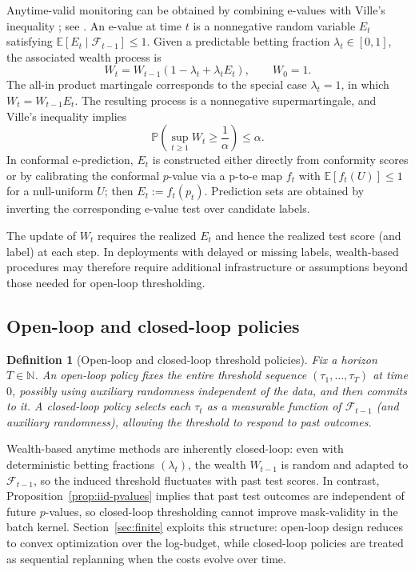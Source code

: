 \documentclass{uai2026} %
\newtheorem{definition}[theorem]{Definition}
\newcommand{\N}{\mathbb{N}}
\newcommand{\1}{\mathbf{1}}
\newcommand{\prob}{\mathbb{P}}
\newcommand{\expec}{\mathbb{E}}
\newcommand{\F}{\mathcal{F}}
\begin{document}
Anytime-valid monitoring can be obtained by combining e-values with Ville's inequality \citep{ville1939etude}; see \citet{gauthier2025values}.
An e-value at time $t$ is a nonnegative random variable $E_t$ satisfying $\expec[E_t\mid\F_{t-1}]\le 1$.
Given a predictable betting fraction $\lambda_t\in[0,1]$, the associated wealth process is
\begin{equation*}
  W_t = W_{t-1}(1-\lambda_t+\lambda_t E_t),\qquad W_0=1.
\end{equation*}
The all-in product martingale corresponds to the special case $\lambda_t=1$, in which $W_t=W_{t-1}E_t$.
The resulting process is a nonnegative supermartingale, and Ville's inequality implies
\begin{equation*}
  \prob\left(\sup_{t\ge 1} W_t\ge \frac{1}{\alpha}\right)\le \alpha.
\end{equation*}
In conformal e-prediction, $E_t$ is constructed either directly from conformity scores or by calibrating the conformal $p$-value via a p-to-e map $f_t$ with $\expec[f_t(U)]\le 1$ for a null-uniform $U$; then $E_t:=f_t(p_t)$.
Prediction sets are obtained by inverting the corresponding e-value test over candidate labels.

The update of $W_t$ requires the realized $E_t$ and hence the realized test score (and label) at each step.
In deployments with delayed or missing labels, wealth-based procedures may therefore require additional infrastructure or assumptions beyond those needed for open-loop thresholding.

\subsection{Open-loop and closed-loop policies}
\label{sec:policies}

\begin{definition}[Open-loop and closed-loop threshold policies]
  Fix a horizon $T\in\N$.
  An \emph{open-loop} policy fixes the entire threshold sequence $(\tau_1,\dots,\tau_T)$ at time $0$, possibly using auxiliary randomness independent of the data, and then commits to it.
  A \emph{closed-loop} policy selects each $\tau_t$ as a measurable function of $\F_{t-1}$ (and auxiliary randomness), allowing the threshold to respond to past outcomes.
\end{definition}

Wealth-based anytime methods are inherently closed-loop: even with deterministic betting fractions $(\lambda_t)$, the wealth $W_{t-1}$ is random and adapted to $\F_{t-1}$, so the induced threshold fluctuates with past test scores.
In contrast, Proposition~\ref{prop:iid-pvalues} implies that past test outcomes are independent of future $p$-values, so closed-loop thresholding cannot improve mask-validity in the batch kernel.
Section~\ref{sec:finite} exploits this structure: open-loop design reduces to convex optimization over the log-budget, while closed-loop policies are treated as sequential replanning when the costs evolve over time.
\end{document}
